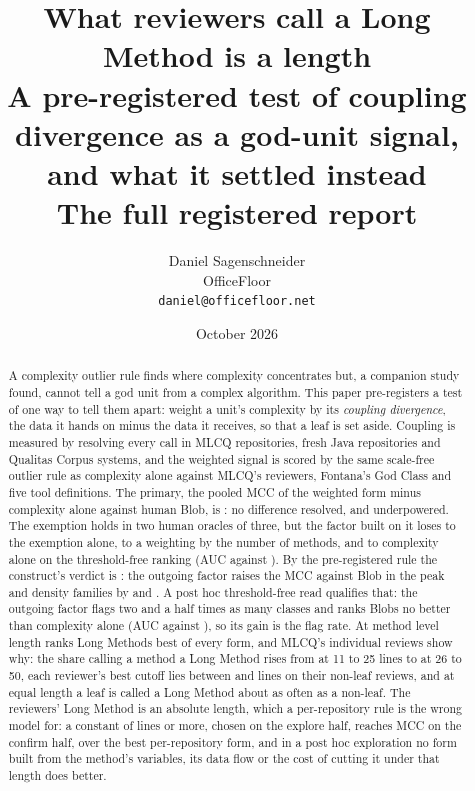 \documentclass[11pt,a4paper]{article}
\title{\bfseries What reviewers call a Long Method is a length\\ A pre-registered test of coupling divergence as a god-unit signal, and what it settled instead\\ \normalsize The full registered report}
\author{Daniel Sagenschneider\\\small OfficeFloor\\\small\texttt{daniel@officefloor.net}\doiline}
\date{October 2026}
\begin{document}
\maketitle

\begin{abstract}
\noindent
A complexity outlier rule finds where complexity concentrates but, a
companion study found, cannot tell a god unit from a complex algorithm.
This paper pre-registers a test of one way to tell them apart: weight a
unit's complexity by its \emph{coupling divergence}, the data it hands on
minus the data it receives, so that a leaf is set aside. Coupling is
measured by resolving every call in \mlcqMeasured{} MLCQ repositories,
\seedThreeMeasured{} fresh Java repositories and \fontanaSystems{} Qualitas
Corpus systems, and the weighted signal is scored by the same scale-free
outlier rule as complexity alone against MLCQ's reviewers, Fontana's God
Class and five tool definitions. The primary, the pooled MCC of the
weighted form minus complexity alone against human Blob, is \primMicro{}:
no difference resolved, and underpowered. The exemption holds in two human
oracles of three, but the factor built on it loses to the exemption alone,
to a weighting by the number of methods, and to complexity alone on the
threshold-free ranking (AUC \primAucX{} against \primAucD{}). By the
pre-registered rule the construct's verdict is \emph{\consVerdict}: the
outgoing factor raises the MCC against Blob in the peak and density families
by \pOneOPeak{} and \pOneODensity{}. A post hoc threshold-free read
qualifies that: the outgoing factor flags two and a half times as many
classes and ranks Blobs no better than complexity alone (AUC
\matchedOAucConfirm{} against \matchedXAucConfirm{}), so its gain is the
flag rate. At method level length ranks Long Methods best of every form,
and MLCQ's individual reviews show why: the share calling a method a Long
Method rises from \revNonLeafTwentyFiveRate{} at 11 to 25 lines to
\revNonLeafFiftyRate{} at 26 to 50, each reviewer's best cutoff lies between
\revCutoffMin{} and \revCutoffMax{} lines on their non-leaf reviews, and at
equal length a leaf is called a Long Method about as often as a non-leaf. The reviewers' Long
Method is an absolute length, which a per-repository rule is the wrong
model for: a constant of \lwLengthCutoff{} lines or more, chosen on the
explore half, reaches MCC \lwLengthMccConfirm{} on the confirm half,
\lwLengthVsRule{} over the best per-repository form, and in a post hoc exploration
no form built from the method's variables, its data flow or the cost of
cutting it under that length does better.
\end{abstract}
\end{document}

